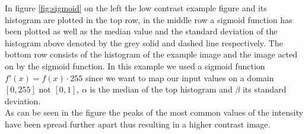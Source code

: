 In figure \ref{fig:sigmoid} on the left the low contrast example figure and its histogram are plotted in the top row, in the middle row a sigmoid function has been plotted as well as the median value and the standard deviation of the histogram above denoted by the grey solid and dashed line respectively. The bottom row consists of the histogram of the example image and the image acted on by the sigmoid function. In this example we used a sigmoid function $f'(x)=f(x) \cdot 255$ since we want to map our input values on a domain $[0,255]$ not $[0,1]$, $\alpha$ is the median of the top histogram and $\beta$ its standard deviation.\\
As can be seen in the figure the peaks of the most common values of the intensity have been spread further apart thus resulting in a higher contrast image.\\
\clearpage

